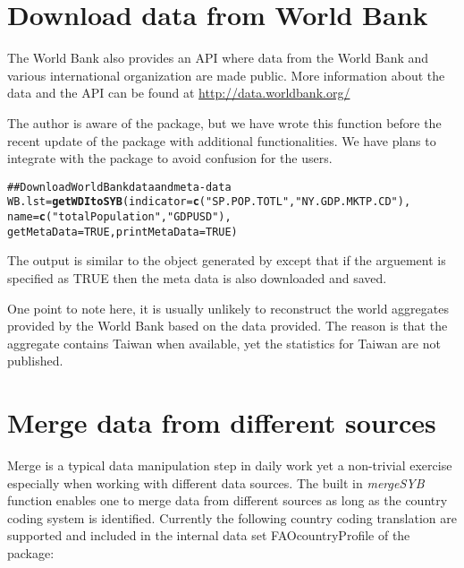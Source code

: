 \documentclass[nojss]{jss}\usepackage{graphicx, color}
\makeatletter
\newcommand{\hlfunctioncall}[1]{\textcolor[rgb]{0.501960784313725,0,0.329411764705882}{\textbf{#1}}}%
\newcommand{\hlstring}[1]{\textcolor[rgb]{0.6,0.6,1}{#1}}%
\newcommand{\hlcomment}[1]{\textcolor[rgb]{0.180392156862745,0.6,0.341176470588235}{#1}}%
\newenvironment{kframe}{%
 \def\at@end@of@kframe{}%
 \ifinner\ifhmode%
  \def\at@end@of@kframe{\end{minipage}}%
  \begin{minipage}{\columnwidth}%
 \fi\fi%
 \def\FrameCommand##1{\hskip\@totalleftmargin \hskip-\fboxsep
 \colorbox{shadecolor}{##1}\hskip-\fboxsep
     \hskip-\linewidth \hskip-\@totalleftmargin \hskip\columnwidth}%
 \MakeFramed {\advance\hsize-\width
   \@totalleftmargin\z@ \linewidth\hsize
   \@setminipage}}%
 {\par\unskip\endMakeFramed%
 \at@end@of@kframe}
\newenvironment{knitrout}{}{} %
\makeatother
\begin{document}

\section{Download data from World Bank}
The World Bank also provides an API where data from the World Bank and
various international organization are made public. More information
about the data and the API can be found at
\url{http://data.worldbank.org/}

The author is aware of the  package, but we have wrote this
function before the recent update of the package with additional
functionalities. We have plans to integrate with the  package
to avoid confusion for the users.


\begin{knitrout}
\color{fgcolor}\begin{kframe}
\begin{alltt}
\hlcomment{## Download World Bank data and meta-data}
WB.lst = \hlfunctioncall{getWDItoSYB}(indicator = \hlfunctioncall{c}(\hlstring{"SP.POP.TOTL"}, \hlstring{"NY.GDP.MKTP.CD"}),
                     name = \hlfunctioncall{c}(\hlstring{"totalPopulation"}, \hlstring{"GDPUSD"}),
                     getMetaData = TRUE, printMetaData = TRUE)
\end{alltt}
\end{kframe}
\end{knitrout}


The output is similar to the object generated by 
except that if the arguement  is specified as TRUE
then the meta data is also downloaded and saved.

One point to note here, it is usually unlikely to reconstruct the
world aggregates provided by the World Bank based on the data
provided. The reason is that the aggregate contains Taiwan when
available, yet the statistics for Taiwan are not published.



\section{Merge data from different sources}
Merge is a typical data manipulation step in daily work yet a
non-trivial exercise especially when working with different data
sources. The built in \textit{mergeSYB} function enables one to merge
data from different sources as long as the country coding system is
identified. Currently the following country coding translation are
supported and included in the internal data set FAOcountryProfile of
the package:
\end{document}

